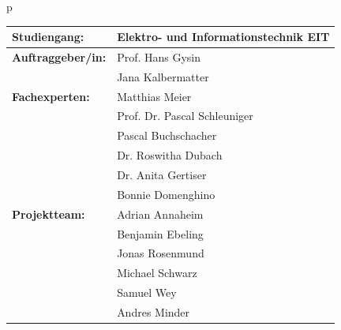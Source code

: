 \begin{center}
\begin{tabular}{p{\textwidth}}
\begin{center}
\begin{tabular}{ll}
\toprule 
\textbf{Studiengang:} 		& Elektro- und Informationstechnik EIT \\
\hline
\textbf{Auftraggeber/in:} 	& Prof. Hans Gysin\\
							& Jana Kalbermatter\\
\hline
\textbf{Fachexperten:} 		& Matthias Meier \\
							& Prof. Dr. Pascal Schleuniger \\
							& Pascal Buchschacher \\
							& Dr. Roswitha Dubach \\
							& Dr. Anita Gertiser \\
							& Bonnie Domenghino \\
\hline
\textbf{Projektteam:} & Adrian Annaheim \\ 
							& Benjamin Ebeling \\ 
 							& Jonas Rosenmund\\ 
 							& Michael Schwarz  \\ 
 							& Samuel Wey \\ 
 							& Andres Minder \\ 
\bottomrule
\end{tabular}
\end{center}

\end{tabular}
\end{center}